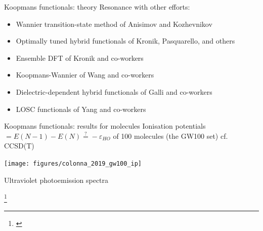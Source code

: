 \documentclass[xcolor=table,aspectratio=169]{beamer}
\newcommand\blfootcite[1]{%
  \begingroup
  \renewcommand\thefootnote{}\footnote{\hspace{-4ex}\cite{#1}}%
  \addtocounter{footnote}{-1}%
  \endgroup
}
\numberwithin{equation}{section}
\begin{document}
\begin{frame}{Koopmans functionals: theory}
   Resonance with other efforts:
   \begin{itemize}
      \item Wannier transition-state method of Anisimov and Kozhevnikov \cite{Anisimov2005}
      \item Optimally tuned hybrid functionals of Kronik, Pasquarello, and others \cite{Kronik2012,Wing2021}
      \item Ensemble DFT of Kronik and co-workers \cite{Kraisler2013}
      \item Koopmans-Wannier of Wang and co-workers \cite{Ma2016}
      \item Dielectric-dependent hybrid functionals of Galli and co-workers \cite{Skone2016a}
      \item LOSC functionals of Yang and co-workers \cite{Li2018}
   \end{itemize}
\end{frame}

\begin{frame}{Koopmans functionals: results for molecules}
   \small
   Ionisation potentials $ = E(N-1) - E(N) \stackrel{?}{=} -\varepsilon_{HO}$ of 100 molecules (the GW100 set) cf. CCSD(T)
   \begin{center}
      \texttt{[image: figures/colonna\_2019\_gw100\_ip]}
   \end{center}

   \vspace{-3ex}
   Ultraviolet photoemission spectra
   \begin{center}
   \end{center}
   \vspace{-2ex}

   \blfootcite{Colonna2018,Nguyen2015}
\end{frame}

% 
% 
% 
\end{document}

